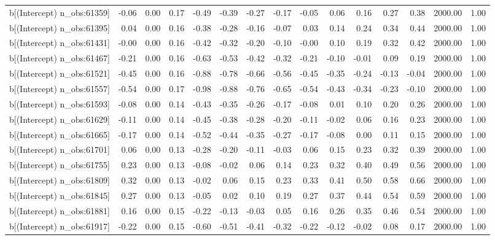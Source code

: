 \begin{table}[ht]
\begin{tabular}{rrrrrrrrrrrrrrr}
  b[(Intercept) n\_obs:61359] & -0.06 & 0.00 & 0.17 & -0.49 & -0.39 & -0.27 & -0.17 & -0.05 & 0.06 & 0.16 & 0.27 & 0.38 & 2000.00 & 1.00 \\ 
  b[(Intercept) n\_obs:61395] & 0.04 & 0.00 & 0.16 & -0.38 & -0.28 & -0.16 & -0.07 & 0.03 & 0.14 & 0.24 & 0.34 & 0.44 & 2000.00 & 1.00 \\ 
  b[(Intercept) n\_obs:61431] & -0.00 & 0.00 & 0.16 & -0.42 & -0.32 & -0.20 & -0.10 & -0.00 & 0.10 & 0.19 & 0.32 & 0.42 & 2000.00 & 1.00 \\ 
  b[(Intercept) n\_obs:61467] & -0.21 & 0.00 & 0.16 & -0.63 & -0.53 & -0.42 & -0.32 & -0.21 & -0.10 & -0.01 & 0.09 & 0.19 & 2000.00 & 1.00 \\ 
  b[(Intercept) n\_obs:61521] & -0.45 & 0.00 & 0.16 & -0.88 & -0.78 & -0.66 & -0.56 & -0.45 & -0.35 & -0.24 & -0.13 & -0.04 & 2000.00 & 1.00 \\ 
  b[(Intercept) n\_obs:61557] & -0.54 & 0.00 & 0.17 & -0.98 & -0.88 & -0.76 & -0.65 & -0.54 & -0.43 & -0.34 & -0.23 & -0.10 & 2000.00 & 1.00 \\ 
  b[(Intercept) n\_obs:61593] & -0.08 & 0.00 & 0.14 & -0.43 & -0.35 & -0.26 & -0.17 & -0.08 & 0.01 & 0.10 & 0.20 & 0.26 & 2000.00 & 1.00 \\ 
  b[(Intercept) n\_obs:61629] & -0.11 & 0.00 & 0.14 & -0.45 & -0.38 & -0.28 & -0.20 & -0.11 & -0.02 & 0.06 & 0.16 & 0.23 & 2000.00 & 1.00 \\ 
  b[(Intercept) n\_obs:61665] & -0.17 & 0.00 & 0.14 & -0.52 & -0.44 & -0.35 & -0.27 & -0.17 & -0.08 & 0.00 & 0.11 & 0.15 & 2000.00 & 1.00 \\ 
  b[(Intercept) n\_obs:61701] & 0.06 & 0.00 & 0.13 & -0.28 & -0.20 & -0.11 & -0.03 & 0.06 & 0.15 & 0.23 & 0.32 & 0.39 & 2000.00 & 1.00 \\ 
  b[(Intercept) n\_obs:61755] & 0.23 & 0.00 & 0.13 & -0.08 & -0.02 & 0.06 & 0.14 & 0.23 & 0.32 & 0.40 & 0.49 & 0.56 & 2000.00 & 1.00 \\ 
  b[(Intercept) n\_obs:61809] & 0.32 & 0.00 & 0.13 & -0.02 & 0.06 & 0.15 & 0.23 & 0.33 & 0.41 & 0.50 & 0.58 & 0.66 & 2000.00 & 1.00 \\ 
  b[(Intercept) n\_obs:61845] & 0.27 & 0.00 & 0.13 & -0.05 & 0.02 & 0.10 & 0.19 & 0.27 & 0.37 & 0.44 & 0.54 & 0.59 & 2000.00 & 1.00 \\ 
  b[(Intercept) n\_obs:61881] & 0.16 & 0.00 & 0.15 & -0.22 & -0.13 & -0.03 & 0.05 & 0.16 & 0.26 & 0.35 & 0.46 & 0.54 & 2000.00 & 1.00 \\ 
  b[(Intercept) n\_obs:61917] & -0.22 & 0.00 & 0.15 & -0.60 & -0.51 & -0.41 & -0.32 & -0.22 & -0.12 & -0.02 & 0.08 & 0.17 & 2000.00 & 1.00 \\ 

\end{tabular}
\end{table}
